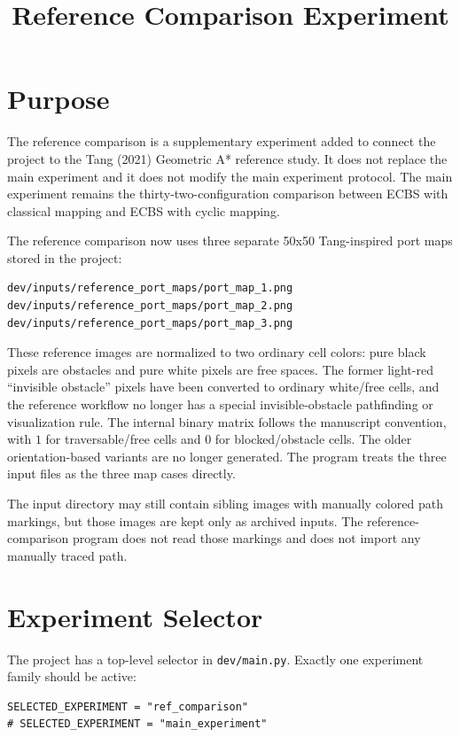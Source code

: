 \documentclass[11pt]{article}
\title{Reference Comparison Experiment}
\author{}
\date{}
\begin{document}
\maketitle

\section{Purpose}

The reference comparison is a supplementary experiment added to connect the project to the Tang (2021) Geometric A* reference study. It does not replace the main experiment and it does not modify the main experiment protocol. The main experiment remains the thirty-two-configuration comparison between ECBS with classical mapping and ECBS with cyclic mapping.

The reference comparison now uses three separate 50x50 Tang-inspired port maps stored in the project:

\begin{lstlisting}
dev/inputs/reference_port_maps/port_map_1.png
dev/inputs/reference_port_maps/port_map_2.png
dev/inputs/reference_port_maps/port_map_3.png
\end{lstlisting}

These reference images are normalized to two ordinary cell colors: pure black pixels are obstacles and pure white pixels are free spaces. The former light-red ``invisible obstacle'' pixels have been converted to ordinary white/free cells, and the reference workflow no longer has a special invisible-obstacle pathfinding or visualization rule. The internal binary matrix follows the manuscript convention, with $1$ for traversable/free cells and $0$ for blocked/obstacle cells. The older orientation-based variants are no longer generated. The program treats the three input files as the three map cases directly.

The input directory may still contain sibling images with manually colored path markings, but those images are kept only as archived inputs. The reference-comparison program does not read those markings and does not import any manually traced path.

\section{Experiment Selector}

The project has a top-level selector in \texttt{dev/main.py}. Exactly one experiment family should be active:

\begin{lstlisting}
SELECTED_EXPERIMENT = "ref_comparison"
# SELECTED_EXPERIMENT = "main_experiment"
\end{lstlisting}
\end{document}
